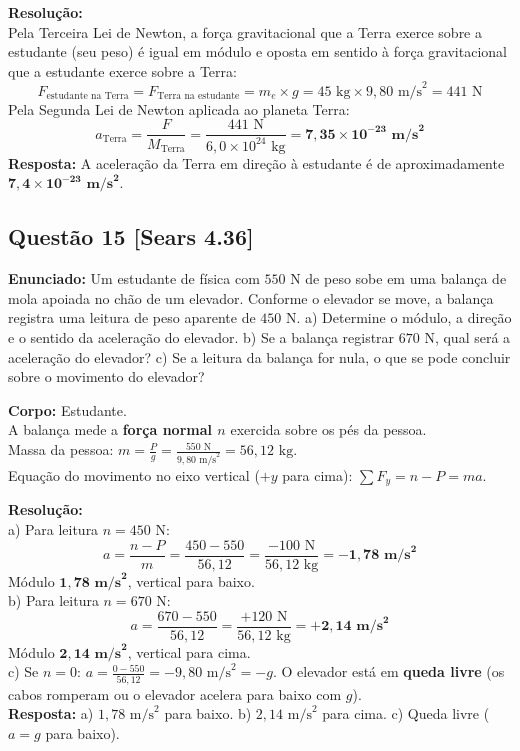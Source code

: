 \documentclass[11pt,a4paper]{article}
\begin{document}
\noindent
\textbf{Resolução:}\\
Pela Terceira Lei de Newton, a força gravitacional que a Terra exerce sobre a estudante (seu peso) é igual em módulo e oposta em sentido à força gravitacional que a estudante exerce sobre a Terra:
\[ F_{\text{estudante na Terra}} = F_{\text{Terra na estudante}} = m_e \times g = 45\text{ kg} \times 9,80\text{ m/s}^2 = 441\text{ N} \]
Pela Segunda Lei de Newton aplicada ao planeta Terra:
\[ a_{\text{Terra}} = \frac{F}{M_{\text{Terra}}} = \frac{441\text{ N}}{6,0 \times 10^{24}\text{ kg}} = \mathbf{7,35 \times 10^{-23}\text{ m/s}^2} \]
\textbf{Resposta:} A aceleração da Terra em direção à estudante é de aproximadamente $\mathbf{7,4 \times 10^{-23}\text{ m/s}^2}$.

\vspace{0.3cm}
\subsection*{Questão 15 [Sears 4.36]}
\textbf{Enunciado:} Um estudante de física com $550\text{ N}$ de peso sobe em uma balança de mola apoiada no chão de um elevador. Conforme o elevador se move, a balança registra uma leitura de peso aparente de $450\text{ N}$. a) Determine o módulo, a direção e o sentido da aceleração do elevador. b) Se a balança registrar $670\text{ N}$, qual será a aceleração do elevador? c) Se a leitura da balança for nula, o que se pode concluir sobre o movimento do elevador?

\begin{dclbox}
\textbf{Corpo:} Estudante.\\
A balança mede a \textbf{força normal $n$} exercida sobre os pés da pessoa.\\
Massa da pessoa: $m = \frac{P}{g} = \frac{550\text{ N}}{9,80\text{ m/s}^2} = 56,12\text{ kg}$.\\
Equação do movimento no eixo vertical ($+y$ para cima): $\sum F_y = n - P = m a$.
\end{dclbox}

\noindent
\textbf{Resolução:}\\
a) Para leitura $n = 450\text{ N}$:
\[ a = \frac{n - P}{m} = \frac{450 - 550}{56,12} = \frac{-100\text{ N}}{56,12\text{ kg}} = \mathbf{-1,78\text{ m/s}^2} \]
Módulo $\mathbf{1,78\text{ m/s}^2}$, vertical para baixo.\\
b) Para leitura $n = 670\text{ N}$:
\[ a = \frac{670 - 550}{56,12} = \frac{+120\text{ N}}{56,12\text{ kg}} = \mathbf{+2,14\text{ m/s}^2} \]
Módulo $\mathbf{2,14\text{ m/s}^2}$, vertical para cima.\\
c) Se $n = 0$: $a = \frac{0 - 550}{56,12} = -9,80\text{ m/s}^2 = -g$. O elevador está em \textbf{queda livre} (os cabos romperam ou o elevador acelera para baixo com $g$).\\
\textbf{Resposta:} a) $1,78\text{ m/s}^2$ para baixo. b) $2,14\text{ m/s}^2$ para cima. c) Queda livre ($a = g$ para baixo).
\end{document}

